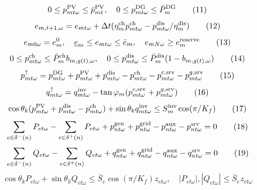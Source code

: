 \documentclass[11pt]{article}
\begin{document}
\begin{equation}
0\le p^{\rm PV}_{mt\omega}\le\bar p^{\rm PV}_{mt},\quad 0\le p^{\rm DG}_{mt\omega}\le\bar P_m^{\rm DG}
\tag{11}
\end{equation}
\begin{equation}
e_{m,t+1,\omega}=e_{mt\omega}+\Delta t(\eta_m^{\rm ch}p^{\rm ch}_{mt\omega}-p^{\rm dis}_{mt\omega}/\eta_m^{\rm dis})
\tag{12}
\end{equation}
\begin{equation}
e_{m0\omega}=e_m^0,\quad\underline e_m\le e_{mt\omega}\le\bar e_m,\quad e_{mN\omega}\ge e_m^{\rm reserve}
\tag{13}
\end{equation}
\begin{equation}
0\le p^{\rm ch}_{mt\omega}\le\bar P_m^{\rm ch}b_{m,g(t),\omega},\quad0\le p^{\rm dis}_{mt\omega}\le\bar P_m^{\rm dis}(1-b_{m,g(t),\omega})
\tag{14}
\end{equation}
\begin{equation}
p^{\uparrow}_{mt\omega}=p^{\rm DG}_{mt\omega}+p^{\rm PV}_{mt\omega}+p^{\rm dis}_{mt\omega}-p^{\rm ch}_{mt\omega}-p^{c,\rm srv}_{mt\omega}-p^{g,\rm srv}_{mt\omega}
\tag{15}
\end{equation}
\begin{equation}
q^{\uparrow}_{mt\omega}=q^{\rm inv}_{mt\omega}-\tan\varphi_m(p^{c,\rm srv}_{mt\omega}+p^{g,\rm srv}_{mt\omega})
\tag{16}
\end{equation}
\begin{equation}
\cos\theta_k(p^{\rm PV}_{mt\omega}+p^{\rm dis}_{mt\omega}-p^{\rm ch}_{mt\omega})+\sin\theta_kq^{\rm inv}_{mt\omega}\le S_m^{\rm inv}\cos(\pi/K_f)
\tag{17}
\end{equation}
\begin{equation}
\sum_{e\in\delta^-(n)}P_{et\omega}-\sum_{e\in\delta^+(n)}P_{et\omega}+p^{\rm gen}_{nt\omega}+p^{\rm grid}_{nt\omega}-p^{\rm aux}_{nt\omega}-p^{\rm srv}_{nt\omega}=0
\tag{18}
\end{equation}
\begin{equation}
\sum_{e\in\delta^-(n)}Q_{et\omega}-\sum_{e\in\delta^+(n)}Q_{et\omega}+q^{\rm gen}_{nt\omega}+q^{\rm grid}_{nt\omega}-q^{\rm aux}_{nt\omega}-q^{\rm srv}_{nt\omega}=0
\tag{19}
\end{equation}
\begin{equation}
\cos\theta_kP_{et\omega}+\sin\theta_kQ_{et\omega}\le\bar S_e\cos(\pi/K_f)z_{et\omega},\quad |P_{et\omega}|,|Q_{et\omega}|\le\bar S_ez_{et\omega}
\tag{20}
\end{equation}
\end{document}
